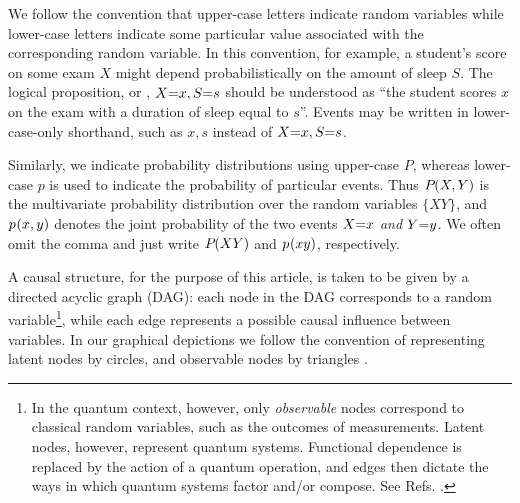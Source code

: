 We follow the convention that upper-case letters indicate random variables while lower-case letters indicate some particular value associated with the corresponding random variable. In this convention, for example, a student's score on some exam $X$ might depend probabilistically on the amount of sleep $S$. The logical proposition, or , $X\mathord{=}x,S\mathord{=}s$ should be understood as ``the student scores $x$ on the exam with a duration of sleep equal to $s$''. Events may be written in lower-case-only shorthand, such as $x,s$ instead of $X\mathord{=}x,S\mathord{=}s$.

Similarly, we indicate probability distributions using upper-case $P$, whereas lower-case $p$ is used to indicate the probability of particular events. Thus ${P_{}}\lparen X, Y\rparen$ is the multivariate probability distribution over the random variables $\{X Y\}$, and ${p_{}}\lparen x, y\rparen$ denotes the joint probability of the two events $X\mathord{=}x$ \emph{and} $Y\mathord{=}y$. We often omit the comma and just write ${P_{}}\lparen X Y\rparen$ and ${p_{}}\lparen x y\rparen$, respectively.


A causal structure, for the purpose of this article, is taken to be given by a directed acyclic graph (DAG): each node in the DAG corresponds to a random variable\footnote{In the quantum context, however, only \emph{observable} nodes correspond to classical random variables, such as the outcomes of measurements. Latent nodes, however, represent quantum systems. Functional dependence is replaced by the action of a quantum operation, and edges then dictate the ways in which quantum systems factor and/or compose. See Refs. \cite{pusey2014gdag,leifer2013conditionalstates}. }, while each edge represents a possible causal influence between variables. In our graphical depictions we follow the convention of representing latent nodes by circles, and observable nodes by triangles \cite{pusey2014gdag}.

